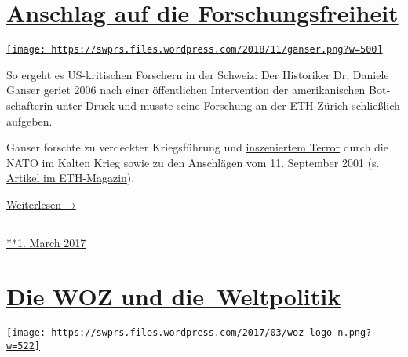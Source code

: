 \hypertarget{anschlag-auf-die-forschungsfreiheit}{%
\section{\texorpdfstring{\href{https://swprs.org/2017/03/01/anschlag-auf-die-forschungsfreiheit/}{Anschlag
auf die
Forschungsfreiheit}}{Anschlag auf die Forschungsfreiheit}}\label{anschlag-auf-die-forschungsfreiheit}}

\href{https://swprs.org/2017/03/01/anschlag-auf-die-forschungsfreiheit/}{\texttt{[image: https://swprs.files.wordpress.com/2018/11/ganser.png?w=500]}}

So ergeht es US-kritischen Forschern in der Schweiz: Der Historiker Dr.
Daniele Ganser geriet 2006 nach einer öffentlichen Inter­vention der
amerika­nischen Bot­schaf­terin unter Druck und musste seine Forschung
an der ETH Zürich schließlich aufgeben.

Ganser forschte zu ver­deckter Kriegs­führung und
\href{http://ofv.ch/sachbuch/detail/natogeheimarmeen-in-europa/3193/}{ins­ze­nier­tem
Terror} durch die NATO im Kalten Krieg sowie zu den An­schlägen vom 11.
September 2001 (s.
\href{http://archiv.ethlife.ethz.ch/articles/9.11.html}{Artikel im
ETH-Magazin}).

\href{https://swprs.org/anschlag-auf-die-forschungsfreiheit\#weiterlesen}{Weiterlesen
→}

\begin{center}\rule{0.5\linewidth}{\linethickness}\end{center}

\href{https://swprs.org/2017/03/01/anschlag-auf-die-forschungsfreiheit/}{**1.
March 2017}

\hypertarget{die-woz-und-die-weltpolitik}{%
\section{\texorpdfstring{\href{https://swprs.org/2017/03/01/die-woz-und-die-weltpolitik/}{Die
WOZ und
die~Weltpolitik}}{Die WOZ und die~Weltpolitik}}\label{die-woz-und-die-weltpolitik}}

\href{https://swprs.org/2017/03/01/die-woz-und-die-weltpolitik/}{\texttt{[image: https://swprs.files.wordpress.com/2017/03/woz-logo-n.png?w=522]}}

